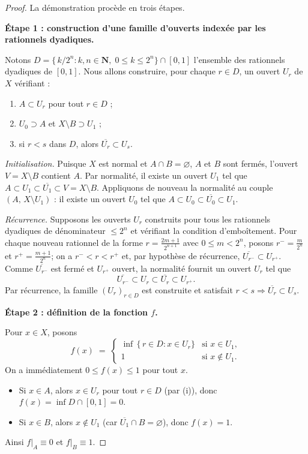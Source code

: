 \documentclass[12pt,a4paper,openany]{book}
\theoremstyle{definition}
\theoremstyle{cours}
\theoremstyle{coursnormal}
\begin{document}
\begin{proof}
La démonstration procède en trois étapes.

\medskip\noindent
\textbf{Étape 1 : construction d'une famille d'ouverts indexée par les
rationnels dyadiques.}

Notons $D=\bigl\{\,k/2^n : k,n\in\mathbf{N},\; 0\le k\le 2^n\bigr\}
\cap [0,1]$ l'ensemble des rationnels dyadiques de $[0,1]$.
Nous allons construire, pour chaque $r\in D$, un ouvert $U_r$ de $X$
vérifiant :
\begin{enumerate}[label=(\roman*)]
  \item $A\subset U_r$ pour tout $r\in D$ ;
  \item $U_0 \supset A$ et $X\setminus B \supset U_1$ ;
  \item si $r<s$ dans $D$, alors $\overline{U_r}\subset U_s$.
\end{enumerate}

\emph{Initialisation.} Puisque $X$ est normal et $A\cap B=\varnothing$,
$A$ et $B$ sont fermés, l'ouvert $V=X\setminus B$ contient $A$.
Par normalité, il existe un ouvert $U_1$ tel que
$A\subset U_1\subset\overline{U_1}\subset V=X\setminus B$.
Appliquons de nouveau la normalité au couple $(A,\,X\setminus U_1)$ :
il existe un ouvert $U_0$ tel que
$A\subset U_0\subset\overline{U_0}\subset U_1$.

\emph{Récurrence.} Supposons les ouverts $U_r$ construits pour tous les
rationnels dyadiques de dénominateur $\le 2^n$ et vérifiant la condition
d'emboîtement. Pour chaque nouveau rationnel de la forme
$r=\frac{2m+1}{2^{n+1}}$ avec $0\le m < 2^n$, posons
$r^{-}=\frac{m}{2^n}$ et $r^{+}=\frac{m+1}{2^n}$; on a $r^{-}<r<r^{+}$
et, par hypothèse de récurrence,
$\overline{U_{r^{-}}}\subset U_{r^{+}}$.
Comme $\overline{U_{r^{-}}}$ est fermé et $U_{r^{+}}$ ouvert,
la normalité fournit un ouvert $U_r$ tel que
\[
\overline{U_{r^{-}}} \subset U_r \subset \overline{U_r} \subset U_{r^{+}}.
\]
Par récurrence, la famille $(U_r)_{r\in D}$ est construite et satisfait
$r<s \Rightarrow \overline{U_r}\subset U_s$.

\medskip\noindent
\textbf{Étape 2 : définition de la fonction $f$.}

Pour $x\in X$, posons
\[
f(x) \;=\;
\begin{cases}
\inf\,\{\,r\in D : x\in U_r\} & \text{si } x\in U_1,\\
1 & \text{si } x\notin U_1.
\end{cases}
\]
On a immédiatement $0\le f(x)\le 1$ pour tout $x$.
\begin{itemize}
  \item Si $x\in A$, alors $x\in U_r$ pour tout $r\in D$ (par (i)),
    donc $f(x)=\inf D\cap[0,1]=0$.
  \item Si $x\in B$, alors $x\notin U_1$ (car $\overline{U_1}\cap B
    =\varnothing$), donc $f(x)=1$.
\end{itemize}
Ainsi $f|_A\equiv 0$ et $f|_B\equiv 1$.


\end{proof}
\end{document}
